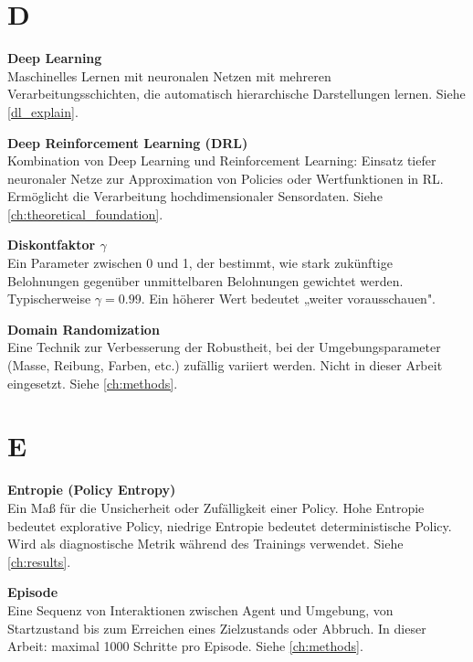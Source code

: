 \section*{D}

\vspace{0.3cm}
\noindent\textbf{Deep Learning} \\
Maschinelles Lernen mit neuronalen Netzen mit mehreren Verarbeitungsschichten, die automatisch hierarchische Darstellungen lernen. Siehe \autoref{dl_explain}.

\vspace{0.5cm}
\noindent\textbf{Deep Reinforcement Learning (DRL)} \\
Kombination von Deep Learning und Reinforcement Learning: Einsatz tiefer neuronaler Netze zur Approximation von Policies oder Wertfunktionen in RL. Ermöglicht die Verarbeitung hochdimensionaler Sensordaten. Siehe \autoref{ch:theoretical_foundation}.

\vspace{0.5cm}
\noindent\textbf{Diskontfaktor $\gamma$} \\
Ein Parameter zwischen 0 und 1, der bestimmt, wie stark zukünftige Belohnungen gegenüber unmittelbaren Belohnungen gewichtet werden. Typischerweise $\gamma = 0.99$. Ein höherer Wert bedeutet „weiter vorausschauen".

\vspace{0.5cm}
\noindent\textbf{Domain Randomization} \\
Eine Technik zur Verbesserung der Robustheit, bei der Umgebungsparameter (Masse, Reibung, Farben, etc.) zufällig variiert werden. Nicht in dieser Arbeit eingesetzt. Siehe \autoref{ch:methods}.

\section*{E}

\vspace{0.3cm}
\noindent\textbf{Entropie (Policy Entropy)} \\
Ein Maß für die Unsicherheit oder Zufälligkeit einer Policy. Hohe Entropie bedeutet explorative Policy, niedrige Entropie bedeutet deterministische Policy. Wird als diagnostische Metrik während des Trainings verwendet. Siehe \autoref{ch:results}.

\vspace{0.5cm}
\noindent\textbf{Episode} \\
Eine Sequenz von Interaktionen zwischen Agent und Umgebung, von Startzustand bis zum Erreichen eines Zielzustands oder Abbruch. In dieser Arbeit: maximal 1000 Schritte pro Episode. Siehe \autoref{ch:methods}.

